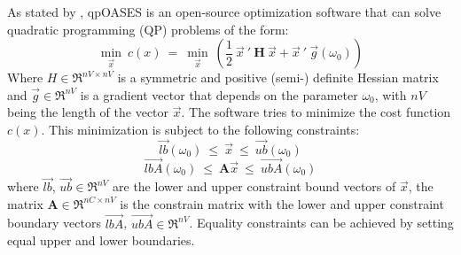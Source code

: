  As stated by \citet{qpoases},  qpOASES is an open-source optimization software that can solve quadratic programming (QP) problems of the form:
\begin{equation}
\underset{\vec{x}}{\min}\ c(x)\ =\  \underset{\vec{x}}{\min}\ \left( \frac{1}{2} \ \vec{x}\ ' \ \textbf{H} \ \vec{x} + \vec{x}\ ' \ \vec{g}(\omega_{0}) \right)
\label{eq:cost_in}
\end{equation}
Where $H \in \Re^{nV\times nV}$ is a symmetric and positive (semi-) definite Hessian matrix and $\vec{g} \in \Re^{nV}$ is a gradient vector that depends on the parameter $\omega_{0}$, with $nV$ being the length of the vector $\vec{x}$. The software tries to minimize the cost function $c(x)$. This minimization is subject to the following constraints:
$$\vec{lb}(\omega_{0})\ \leq\ \vec{x}\ \leq\ \vec{ub}(\omega_{0})$$
$$\vec{lbA}(\omega_{0})\ \leq\ \textbf{A}\vec{x}\ \leq\ \vec{ubA}(\omega_{0})$$
where $\vec{lb}$, $\vec{ub} \in \Re^{nV}$ are the lower and upper constraint bound vectors of $\vec{x}$, the matrix $\textbf{A} \in \Re^{nC\times nV}$ is the constrain matrix with the lower and upper constraint boundary vectors $\vec{lbA}$, $\vec{ubA} \in \Re^{nV}$. Equality constraints can be achieved by setting equal upper and lower boundaries.
 
